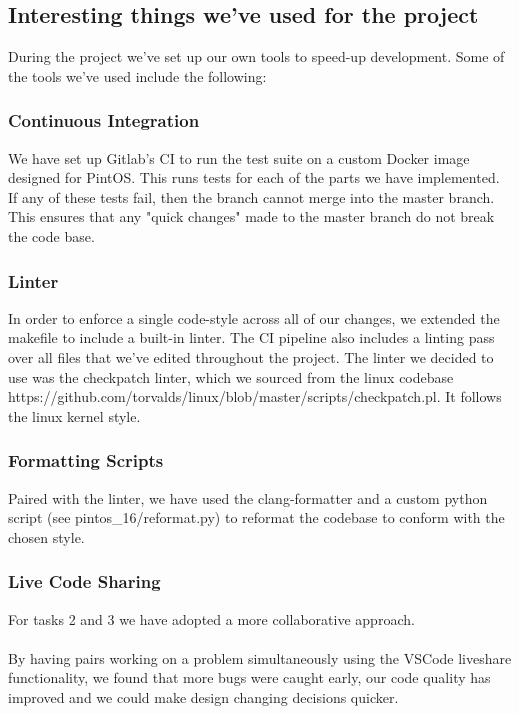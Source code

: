 \documentclass{report}
\begin{document}
		\subsection*{Interesting things we've used for the project}
		During the project we've set up our own tools to speed-up development. Some
		of the tools we've used include the following:

			\subsubsection*{Continuous Integration}
			We have set up Gitlab's CI to run the test suite on a custom Docker image 
			designed for PintOS. This runs tests for
			each of the parts we have implemented. If any of these tests fail, then the 
			branch cannot merge into the master branch. This ensures that any "quick changes" 
			made to the master branch do not break the code base.
			
			\subsubsection*{Linter}
			In order to enforce a single code-style across all of our changes, we 
			extended the makefile to include a built-in linter. The CI pipeline also 
			includes a linting pass over all files that we've edited throughout the 
			project. The linter we decided to use was the checkpatch linter, which 
			we sourced from the linux codebase 
			https://github.com/torvalds/linux/blob/master/scripts/checkpatch.pl. 
			It follows the linux kernel style.
			
			\subsubsection*{Formatting Scripts}
			Paired with the linter, we have used the clang-formatter and a custom 
			python script (see pintos\_16/reformat.py) to reformat the codebase to 
			conform with the chosen style. 

			\subsubsection*{Live Code Sharing}
			For tasks 2 and 3 we have adopted a more collaborative approach.
			\\
			\\ By having pairs working on a problem simultaneously using the
			VSCode liveshare functionality, we found that more bugs were caught early, 
			our code quality has improved and we could make design changing decisions 
			quicker.
\end{document}
